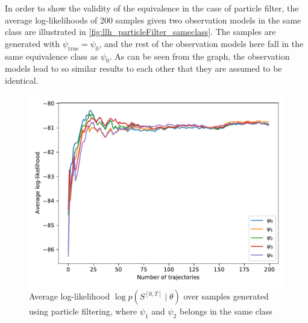 In order to show the validity of the equivalence in the case of particle filter, the average log-likelihoods of 200 samples given two observation models in the same class are illustrated in \autoref{fig:llh_particleFilter_sameclass}. The samples are generated with $ \psi_{\text{true}} = \psi_{0} $, and the rest of the observation models here fall in the same equivalence class as $ \psi_0 $. As can be seen from the graph, the observation models lead to so similar results to each other that they are assumed to be identical. 
\begin{figure}[H]
	\begin{center}
		\includegraphics[width=.8\textwidth]{figures/equivalence_classes/llh_particleFilter_sameclass}
		\caption{Average log-likelihood $ \log p(S^{[0,T]} \mid \theta) $ over samples generated using particle filtering, where $ \psi_1 $ and $ \psi_2 $ belongs in the same class}
		\label{fig:llh_particleFilter_sameclass}
	\end{center}
\end{figure} 
